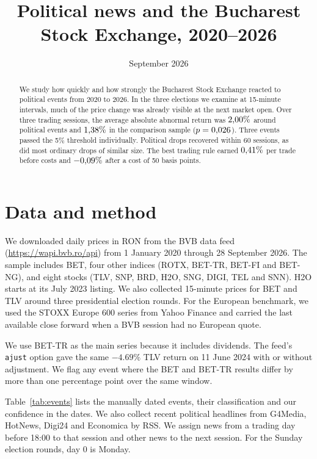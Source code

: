 \documentclass[11pt,a4paper]{article}
\title{Political news and the Bucharest Stock Exchange, 2020--2026}
\author{}
\date{September 2026}
\begin{document}

\maketitle

\begin{abstract}
We study how quickly and how strongly the Bucharest Stock Exchange reacted to
\NEvents{} political events from 2020 to 2026. In the three elections we examine
at 15-minute intervals, much of the price change was already visible at the next
market open. Over three trading sessions, the average absolute abnormal return
was $2{,}00\%$ around political events and $1{,}38\%$ in the comparison
sample ($p=0{,}026$). Three events passed the 5\% threshold individually. Political
drops recovered within 60 sessions, as did most ordinary drops of similar size.
The best trading rule earned $0{,}41\%$ per trade before costs and
$-0{,}09\%$ after a cost of 50 basis points.
\end{abstract}

\section{Data and method}

We downloaded daily prices in RON from the BVB data feed
(\url{https://wapi.bvb.ro/api}) from 1 January 2020 through 28 September 2026.
The sample includes BET, four other indices (ROTX, BET-TR, BET-FI and BET-NG),
and eight stocks (TLV, SNP, BRD, H2O, SNG, DIGI, TEL and SNN). H2O starts at its
July 2023 listing. We also collected 15-minute prices for BET and TLV around
three presidential election rounds. For the European benchmark, we used the
STOXX Europe 600 series from Yahoo Finance and carried the last available close
forward when a BVB session had no European quote.

We use BET-TR as the main series because it includes dividends. The feed's
\texttt{ajust} option gave the same $-4.69\%$ TLV return on 11 June 2024 with or
without adjustment. We flag any event where the BET and BET-TR results differ
by more than one percentage point over the same window.

Table~\ref{tab:events} lists the \NEvents{} manually dated events, their
classification and our confidence in the dates. We also collect recent
political headlines from G4Media, HotNews, Digi24 and Economica by RSS.
We assign news from a trading day before 18:00 to that session and other news
to the next session. For the Sunday election rounds, day 0 is Monday.
\end{document}

